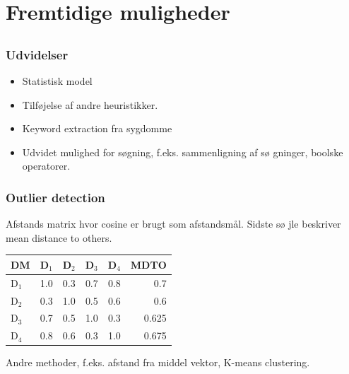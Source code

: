 \documentclass[xcolor=table]{beamer}
\begin{document}
\section{Fremtidige muligheder}

\subsection*{}

\begin{frame}

  \frametitle{Udvidelser}

  \begin{itemize}
    \item Statistisk model
    \item Tilf\o jelse af andre heuristikker.
    \item Keyword extraction fra sygdomme
    \item Udvidet mulighed for s\o gning, f.eks. sammenligning af s\o
      gninger, boolske operatorer.
  \end{itemize}

\end{frame}

\begin{frame}

  \frametitle{Outlier detection}

  Afstands matrix hvor cosine er brugt som afstandsm\aa l. Sidste s\o
  jle beskriver mean distance to others.

  \begin{center}
    \begin{tabular}{|l|r|r|r|r|r|}
      \hline
      DM    & D$_1$ & D$_2$ & D$_3$ & D$_4$ & MDTO \\
      \hline
      D$_1$ &   1.0 &   0.3 &   0.7 &   0.8 & 0.7 \\
      \hline
      D$_2$ &   0.3 &   1.0 &   0.5 &   0.6 & 0.6 \\
      \hline
      D$_3$ &   0.7 &   0.5 &   1.0 &   0.3 & 0.625 \\
      \hline
      D$_4$ &   0.8 &   0.6 &   0.3 &   1.0 & 0.675 \\
      \hline
    \end{tabular}
  \end{center}


  Andre methoder, f.eks. afstand fra middel vektor, K-means
  clustering.

\end{frame}





\end{document}
